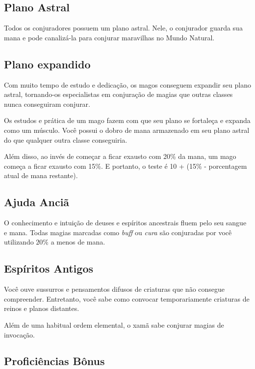 \begin{multicols}{2}

\section*{Plano Astral}%

Todos os conjuradores possuem um plano astral. Nele, o conjurador guarda sua
mana e pode canalizá-la para conjurar maravilhas no Mundo Natural.

\subsection*{Plano expandido}%

Com muito tempo de estudo e dedicação, os magos conseguem expandir seu plano
astral, tornando-os especialistas em conjuração de magias que outras classes
nunca conseguiram conjurar.

Os estudos e prática de um mago fazem com que seu plano se fortaleça e expanda
como um músculo. Você possui o dobro de mana armazenado em seu plano astral do
que qualquer outra classe conseguiria.

Além disso, ao invés de começar a ficar exausto com 20\% da mana, um mago
começa a ficar exausto com 15\%. E portanto, o teste é 10 + (15\% - porcentagem
atual de mana restante).

\subsection*{Ajuda Anciã}%

O conhecimento e intuição de deuses e espíritos ancestrais fluem pelo seu sangue
e mana. Todas magias marcadas como \textit{buff} ou \textit{cura} são conjuradas
por você utilizando $20\%$ a menos de mana.

\subsection*{Espíritos Antigos}%

Você ouve sussurros e pensamentos difusos de criaturas que não consegue
compreender. Entretanto, você sabe como convocar temporariamente criaturas de
reinos e planos distantes.

Além de uma habitual ordem elemental, o xamã sabe conjurar magias de invocação.

\subsection*{Proficiências Bônus}%


\end{multicols}
